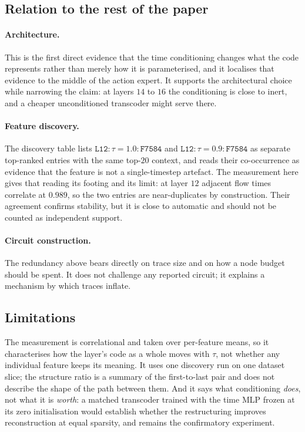 \subsection{Relation to the rest of the paper}

\paragraph{Architecture.} This is the first direct evidence that the time
conditioning changes what the code represents rather than merely how it is
parameterised, and it localises that evidence to the middle of the action
expert. It supports the architectural choice while narrowing the claim: at
layers $14$ to $16$ the conditioning is close to inert, and a cheaper
unconditioned transcoder might serve there.

\paragraph{Feature discovery.} The discovery table lists
$\mathtt{L12}\!:\!\tau\!=\!1.0\!:\!\mathtt{F7584}$ and
$\mathtt{L12}\!:\!\tau\!=\!0.9\!:\!\mathtt{F7584}$ as separate top-ranked
entries with the same top-$20$ context, and reads their co-occurrence as
evidence that the feature is not a single-timestep artefact. The measurement
here gives that reading its footing and its limit: at layer $12$ adjacent flow
times correlate at $0.989$, so the two entries are near-duplicates by
construction. Their agreement confirms stability, but it is close to
automatic and should not be counted as independent support.

\paragraph{Circuit construction.} The redundancy above bears directly on trace
size and on how a node budget should be spent. It does not challenge any
reported circuit; it explains a mechanism by which traces inflate.

\subsection{Limitations}

The measurement is correlational and taken over per-feature means, so it
characterises how the layer's code as a whole moves with $\tau$, not whether any
individual feature keeps its meaning. It uses one discovery run on one dataset
slice; the structure ratio is a summary of the first-to-last pair and does not
describe the shape of the path between them. And it says what conditioning
\emph{does}, not what it is \emph{worth}: a matched transcoder trained with the
time MLP frozen at its zero initialisation would establish whether the
restructuring improves reconstruction at equal sparsity, and remains the
confirmatory experiment.
